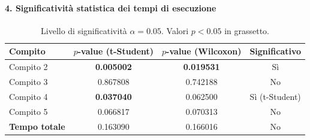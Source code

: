 \paragraph{4. Significatività statistica dei tempi di esecuzione}\mbox{}\par\vspace{0.5ex}
\begin{table}[h!]
    \centering
    \small
    \begin{tabular}{lccc}
        \toprule
        \textbf{Compito} & \textbf{$p$-value (t-Student)} & \textbf{$p$-value (Wilcoxon)} & \textbf{Significativo} \\
        \midrule
        Compito 2 & \textbf{0.005002} & \textbf{0.019531} & Sì \\
        Compito 3 & 0.867808 & 0.742188 & No \\
        Compito 4 & \textbf{0.037040} & 0.062500 & Sì (t-Student) \\
        Compito 5 & 0.066817 & 0.070313 & No \\
        \midrule
        \textbf{Tempo totale} & 0.163090 & 0.166016 & No \\
        \bottomrule
    \end{tabular}
    \caption*{\small Livello di significatività $\alpha = 0.05$. Valori $p < 0.05$ in grassetto.}
\end{table}


